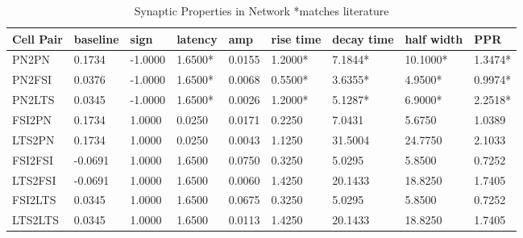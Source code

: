 \documentclass[12pt, letterpaper]{article}
\begin{document}
\begin{table}[H]
  \centering
  \caption{Synaptic Properties in Network *matches literature}
  \begin{tabularx}{\textwidth}{|X|X|X|X|X|X|X|X|X}
    \hline
    Cell Pair & baseline & sign & latency & amp & rise time & decay time & half width & PPR \\ \hline
    PN2PN & 0.1734 & -1.0000 & 1.6500* & 0.0155 & 1.2000* & 7.1844* & 10.1000* & 1.3474* \\ \hline
    PN2FSI & 0.0376 & -1.0000 & 1.6500* & 0.0068 & 0.5500* & 3.6355* & 4.9500* & 0.9974* \\ \hline
    PN2LTS & 0.0345 & -1.0000 & 1.6500* & 0.0026 & 1.2000* & 5.1287* & 6.9000* & 2.2518* \\ \hline
    FSI2PN & 0.1734 & 1.0000 & 0.0250 & 0.0171 & 0.2250 & 7.0431 & 5.6750 & 1.0389 \\ \hline
    LTS2PN & 0.1734 & 1.0000 & 0.0250 & 0.0043 & 1.1250 & 31.5004 & 24.7750 & 2.1033 \\ \hline
    FSI2FSI & -0.0691 & 1.0000 & 1.6500 & 0.0750 & 0.3250 & 5.0295 & 5.8500 & 0.7252 \\ \hline
    LTS2FSI & -0.0691 & 1.0000 & 1.6500 & 0.0060 & 1.4250 & 20.1433 & 18.8250 & 1.7405 \\ \hline
    FSI2LTS & 0.0345 & 1.0000 & 1.6500 & 0.0675 & 0.3250 & 5.0295 & 5.8500 & 0.7252 \\ \hline
    LTS2LTS & 0.0345 & 1.0000 & 1.6500 & 0.0113 & 1.4250 & 20.1433 & 18.8250 & 1.7405 \\ \hline
  \end{tabularx}
  \label{tab:syn_prop}
\end{table}
\end{document}
